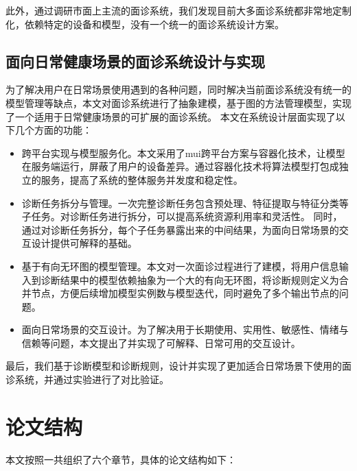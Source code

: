 此外，通过调研市面上主流的面诊系统，我们发现目前大多面诊系统都非常地定制化，依赖特定的设备和模型，没有一个统一的面诊系统设计方案。


\subsection{面向日常健康场景的面诊系统设计与实现}

为了解决用户在日常场景使用遇到的各种问题，同时解决当前面诊系统没有统一的模型管理等缺点，本文对面诊系统进行了抽象建模，基于图的方法管理模型，实现了一个适用于日常健康场景的可扩展的面诊系统。
本文在系统设计层面实现了以下几个方面的功能：

\begin{itemize}

    \item 跨平台实现与模型服务化。本文采用了mui跨平台方案与容器化技术，让模型在服务端运行，屏蔽了用户的设备差异。通过容器化技术将算法模型打包成独立的服务，提高了系统的整体服务并发度和稳定性。

    \item 诊断任务拆分与管理。一次完整诊断任务包含预处理、特征提取与特征分类等子任务。对诊断任务进行拆分，可以提高系统资源利用率和灵活性。
    同时，通过对诊断任务拆分，每个子任务暴露出来的中间结果，为面向日常场景的交互设计提供可解释的基础。
    
    \item 基于有向无环图的模型管理。本文对一次面诊过程进行了建模，将用户信息输入到诊断结果中的模型依赖抽象为一个大的有向无环图，将诊断规则定义为合并节点，方便后续增加模型实例数与模型迭代，同时避免了多个输出节点的问题。
    
    \item 面向日常场景的交互设计。为了解决用于长期使用、实用性、敏感性、情绪与信赖等问题，本文提出了并实现了可解释、日常可用的交互设计。

\end{itemize}

最后，我们基于诊断模型和诊断规则，设计并实现了更加适合日常场景下使用的面诊系统，并通过实验进行了对比验证。

\section{论文结构}
本文按照一共组织了六个章节，具体的论文结构如下：

